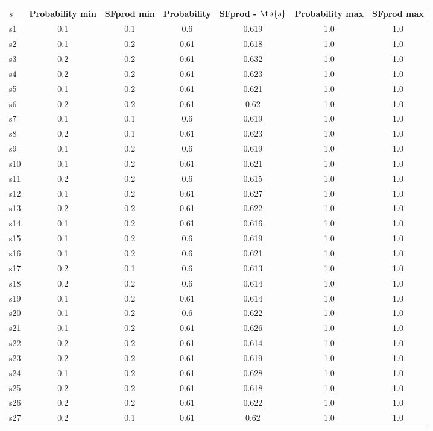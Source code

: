 \documentclass{article}
\begin{document}
\noindent\begin{tabular}{|l|c|c|c|c|c|c|}
\hline
$s$& Probability min & SFprod min & Probability & SFprod - $\ts{s}$ & Probability max & SFprod max\\
\hline
s1 &0.1 & 0.1 & 0.6 & 0.619 & 1.0 & 1.0\\
\hline
s2 &0.1 & 0.2 & 0.61 & 0.618 & 1.0 & 1.0\\
\hline
s3 &0.2 & 0.2 & 0.61 & 0.632 & 1.0 & 1.0\\
\hline
s4 &0.2 & 0.2 & 0.61 & 0.623 & 1.0 & 1.0\\
\hline
s5 &0.1 & 0.2 & 0.61 & 0.621 & 1.0 & 1.0\\
\hline
s6 &0.2 & 0.2 & 0.61 & 0.62 & 1.0 & 1.0\\
\hline
s7 &0.1 & 0.1 & 0.6 & 0.619 & 1.0 & 1.0\\
\hline
s8 &0.2 & 0.1 & 0.61 & 0.623 & 1.0 & 1.0\\
\hline
s9 &0.1 & 0.2 & 0.6 & 0.619 & 1.0 & 1.0\\
\hline
s10 &0.1 & 0.2 & 0.61 & 0.621 & 1.0 & 1.0\\
\hline
s11 &0.2 & 0.2 & 0.6 & 0.615 & 1.0 & 1.0\\
\hline
s12 &0.1 & 0.2 & 0.61 & 0.627 & 1.0 & 1.0\\
\hline
s13 &0.2 & 0.2 & 0.61 & 0.622 & 1.0 & 1.0\\
\hline
s14 &0.1 & 0.2 & 0.61 & 0.616 & 1.0 & 1.0\\
\hline
s15 &0.1 & 0.2 & 0.6 & 0.619 & 1.0 & 1.0\\
\hline
s16 &0.1 & 0.2 & 0.6 & 0.621 & 1.0 & 1.0\\
\hline
s17 &0.2 & 0.1 & 0.6 & 0.613 & 1.0 & 1.0\\
\hline
s18 &0.2 & 0.2 & 0.6 & 0.614 & 1.0 & 1.0\\
\hline
s19 &0.1 & 0.2 & 0.61 & 0.614 & 1.0 & 1.0\\
\hline
s20 &0.1 & 0.2 & 0.6 & 0.622 & 1.0 & 1.0\\
\hline
s21 &0.1 & 0.2 & 0.61 & 0.626 & 1.0 & 1.0\\
\hline
s22 &0.2 & 0.2 & 0.61 & 0.614 & 1.0 & 1.0\\
\hline
s23 &0.2 & 0.2 & 0.61 & 0.619 & 1.0 & 1.0\\
\hline
s24 &0.1 & 0.2 & 0.61 & 0.628 & 1.0 & 1.0\\
\hline
s25 &0.2 & 0.2 & 0.61 & 0.618 & 1.0 & 1.0\\
\hline
s26 &0.2 & 0.2 & 0.61 & 0.622 & 1.0 & 1.0\\
\hline
s27 &0.2 & 0.1 & 0.61 & 0.62 & 1.0 & 1.0\\

\end{tabular}
\end{document}
